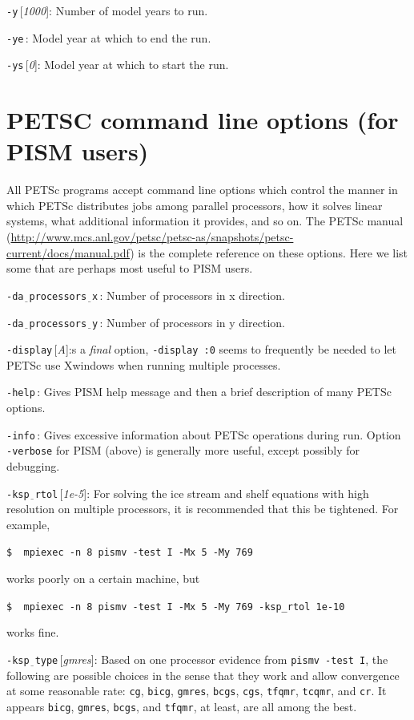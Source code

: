 \documentclass[11pt,final]{amsart}
\renewcommand{\t}[1]{\texttt{#1}}
\newcommand{\rawopt}[1]{\vspace{1mm}\noindent \Large\texttt{-#1}\normalsize}
\newcommand{\opt}[1]{\rawopt{#1}\,:\quad}
\newcommand{\optdef}[2]{\rawopt{#1}\,[\textsl{#2}]:\quad}
\newcommand{\und}{$\underline{\,\,\,}$}
\begin{document}
\optdef{y}{1000} Number of model years to run.

\opt{ye} Model year at which to end the run.

\optdef{ys}{0} Model year at which to start the run.


\clearpage\newpage
\section{PETSC command line options (for PISM users)}  All PETSc programs accept command line options which control the manner in which PETSc distributes jobs among parallel processors, how it solves linear systems, what additional information it provides, and so on.  The PETSc manual (\url{http://www.mcs.anl.gov/petsc/petsc-as/snapshots/petsc-current/docs/manual.pdf}) is the complete reference on these options.  Here we list some that are perhaps most useful to PISM users.

\opt{da\und processors\und x}  Number of processors in x direction.

\opt{da\und processors\und y}  Number of processors in y direction.

\optdef{display}  As a \emph{final} option, \verb|-display :0| seems to frequently be needed to let PETSc use Xwindows when running multiple processes.

\opt{help}  Gives PISM help message and then a brief description of many PETSc options.

\opt{info}  Gives excessive information about PETSc operations during run.  Option \verb|-verbose| for PISM (above) is generally more useful, except possibly for debugging.

\optdef{ksp\und rtol}{1e-5}  For solving the ice stream and shelf equations with high resolution on multiple processors, it is recommended that this be tightened.  For example, 

\verb|$  mpiexec -n 8 pismv -test I -Mx 5 -My 769|

\noindent works poorly on a certain machine, but

\verb|$  mpiexec -n 8 pismv -test I -Mx 5 -My 769 -ksp_rtol 1e-10|

\noindent works fine.

\optdef{ksp\und type}{gmres}  Based on one processor evidence from \verb|pismv -test I|, the following are possible choices in the sense that they work and allow convergence at some reasonable rate: \t{cg}, \t{bicg}, \t{gmres}, \t{bcgs}, \t{cgs}, \t{tfqmr}, \t{tcqmr}, and \t{cr}.  It appears \t{bicg}, \t{gmres}, \t{bcgs}, and \t{tfqmr}, at least, are all among the best.
\end{document}
